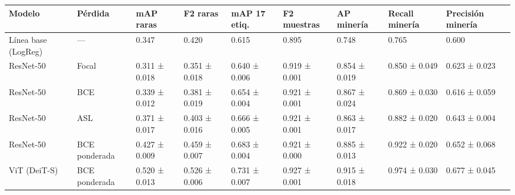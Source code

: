 \begin{tabular}{lllllllll}
\toprule
Modelo & Pérdida & mAP raras & F2 raras & mAP 17 etiq. & F2 muestras & AP minería & Recall minería & Precisión minería \\
\midrule
Línea base (LogReg) & — & 0.347 & 0.420 & 0.615 & 0.895 & 0.748 & 0.765 & 0.600 \\
ResNet-50 & Focal & 0.311 ± 0.018 & 0.351 ± 0.018 & 0.640 ± 0.006 & 0.919 ± 0.001 & 0.854 ± 0.019 & 0.850 ± 0.049 & 0.623 ± 0.023 \\
ResNet-50 & BCE & 0.339 ± 0.012 & 0.381 ± 0.019 & 0.654 ± 0.004 & 0.921 ± 0.001 & 0.867 ± 0.024 & 0.869 ± 0.030 & 0.616 ± 0.059 \\
ResNet-50 & ASL & 0.371 ± 0.017 & 0.403 ± 0.016 & 0.666 ± 0.005 & 0.921 ± 0.001 & 0.863 ± 0.017 & 0.882 ± 0.020 & 0.643 ± 0.004 \\
ResNet-50 & BCE ponderada & 0.427 ± 0.009 & 0.459 ± 0.007 & 0.683 ± 0.004 & 0.921 ± 0.000 & 0.885 ± 0.013 & 0.922 ± 0.020 & 0.652 ± 0.068 \\
ViT (DeiT-S) & BCE ponderada & 0.520 ± 0.013 & 0.526 ± 0.006 & 0.731 ± 0.007 & 0.927 ± 0.001 & 0.915 ± 0.018 & 0.974 ± 0.030 & 0.677 ± 0.045 \\
\bottomrule
\end{tabular}
